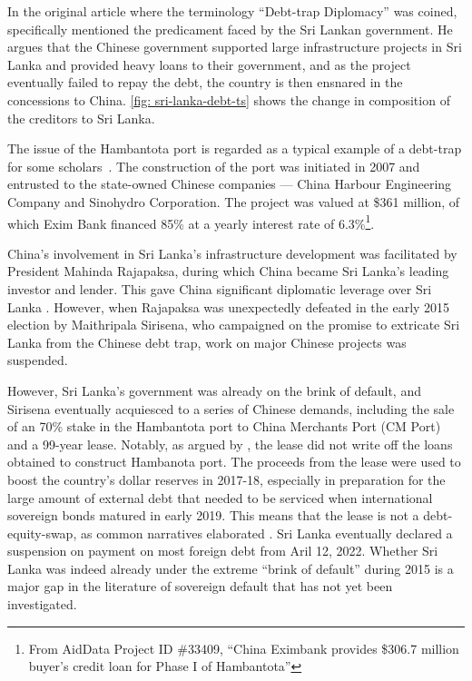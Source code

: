 In the original article where the terminology ``Debt-trap Diplomacy'' was coined, \citet{Chellaney_2017} specifically mentioned the predicament faced by the Sri Lankan government. He argues that the Chinese government supported large infrastructure projects in Sri Lanka and provided heavy loans to their government, and as the project eventually failed to repay the debt, the country is then ensnared in the concessions to China. \autoref{fig: sri-lanka-debt-ts} shows the change in composition of the creditors to Sri Lanka.

The issue of the Hambantota port is regarded as a typical example of a debt-trap for some scholars~\citep*{Moramudali_2020}.
The construction of the port was initiated in 2007 and entrusted to the state-owned Chinese companies --- China Harbour Engineering Company and Sinohydro Corporation. The project was valued at \$361 million, of which Exim Bank financed 85\% at a yearly interest rate of 6.3\%\footnote{From AidData Project ID \#33409, ``China Eximbank provides \$306.7 million buyer's credit loan for Phase I of Hambantota''}.


China's involvement in Sri Lanka's infrastructure development was facilitated by President Mahinda Rajapaksa, during which China became Sri Lanka's leading investor and lender. This gave China significant diplomatic leverage over Sri Lanka \citep*{Chellaney_2017}.
However, when Rajapaksa was unexpectedly defeated in the early 2015 election by Maithripala Sirisena, who campaigned on the promise to extricate Sri Lanka from the Chinese debt trap, work on major Chinese projects was suspended.

However, Sri Lanka's government was already on the brink of default, and Sirisena eventually acquiesced to a series of Chinese demands\footnotemark{}, including the sale of an 70\% stake in the Hambantota port to China Merchants Port (CM Port) and a 99-year lease.
Notably, as argued by \citet*{Moramudali_2019}, the lease did not write off the loans obtained to construct Hambanota port. The proceeds from the lease were used to boost the country's dollar reserves in 2017-18, especially in preparation for the large amount of external debt that needed to be serviced when international sovereign bonds matured in early 2019. This means that the lease is not a debt-equity-swap, as common narratives elaborated \citep*{Moramudali_2020}.
Sri Lanka eventually declared a suspension on payment on most foreign debt from Aril 12, 2022. Whether Sri Lanka was indeed already under the extreme ``brink of default'' during 2015 is a major gap in the literature of sovereign default that has not yet been investigated.
